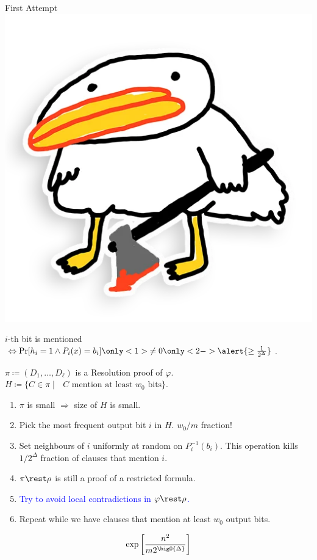 \begin{frame}{First Attempt \hspace{0.2cm} \includegraphics[scale = 0.03]{pics/utia-blood.png}}

    $i$-th bit is mentioned $\Leftrightarrow \Pr[h_i = 1 \land P_i(x) = b_i] \only<1>{\neq
        0}\only<2->{\alert{\ge \frac{1}{2^{\Delta}}}}$.

    \pause
    \pause
    $\pi \coloneqq (D_1, \dots, D_{\ell})$ is a Resolution proof of $\varphi$. $H \coloneqq \{C \in \pi
    \mid \text{ $C$ mention at least $w_0$ bits} \}$.

    \begin{enumerate}
        \item $\pi$ is small $\Rightarrow$ size of $H$ is small.
        \pause
        \item Pick the most frequent output bit $i$ in $H$. \alert{$w_0 / m$ fraction!}
        \pause
        \item Set \alert{neighbours} of $i$ uniformly at random on $P_i^{-1}(b_i)$. This
            operation kills \alert{$1 / 2^{\Delta}$ fraction} of clauses that mention $i$.
        \pause
        \item $\pi \rest \rho$ is still a proof of a restricted formula.
        \pause
        \item \textcolor{blue}{Try to avoid local contradictions in $\varphi \rest \rho$.}
        \pause    
        \item Repeat while we have clauses that \alert{mention at least $w_0$ output bits}.
    \end{enumerate}

    
    $$\exp\left[\frac{n^2}{m 2^{\bigO{\Delta}}}\right]$$
    
\end{frame}


